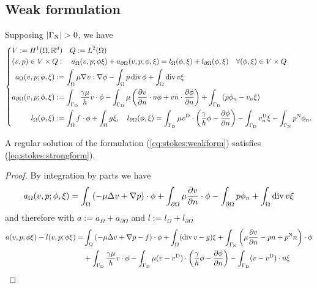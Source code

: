 \subsection{Weak formulation}\label{subsec:}
%
Supposing $\abs{\GammaN}>0$, we have
%
\begin{equation}\label{eq:stokes:weakform}
%
\left\{
\begin{aligned}
&V :=  H^1(\Omega,\R^d)\quad Q := L^2(\Omega)\\
&(v,p)\in V\times Q:\quad a_{\Omega}(v,p; \phi\xi) + a_{\partial\Omega}(v,p; \phi,\xi) = l_{\Omega}(\phi,\xi)+l_{\partial\Omega}(\phi,\xi) \quad\forall (\phi,\xi)\in V\times Q\\
&\begin{aligned}
a_{\Omega}(v,p; \phi,\xi) &:= \int_{\Omega} \mu \nabla v:\nabla\phi - \int_{\Omega}p \div \phi + \int_{\Omega} \div v \xi\\
 a_{\partial\Omega}(v,p; \phi,\xi) &:= \int_{\GammaD}\frac{\gamma\mu}{h}v\cdot\phi - 
 \int_{\GammaD}\mu \left(  \dn{v}\cdot n \phi + v n \cdot \dn{\phi}\right) 
 + \int_{\GammaD} \left( p \phi_n - v_n \xi\right)\\
 l_{\Omega}(\phi,\xi) &:= \int_{\Omega} f\cdot\phi + \int_{\Omega} g\xi, \quad
 l_{\partial\Omega}(\phi,\xi) = \int_{\GammaD}\mu\vD\cdot\left( \frac{\gamma}{h}\phi - \dn{\phi}\right)- \int_{\GammaD}\vD_n\xi
 - \int_{\GammaN} \pN \phi_n.
\end{aligned}
\end{aligned}
\right.
%
\end{equation}
%
\begin{lemma}\label{lemma:}
A regular solution of the formulation (\ref{eq:stokes:weakform}) satisfies (\ref{eq:stokes:strongform}).
\end{lemma}
%
\begin{proof}
By integration by parts we have
%
\begin{align*}
a_{\Omega}(v,p; \phi,\xi) = \int_{\Omega} \left( -\mu \Delta v+\nabla p\right)\cdot\phi + 
\int_{\partial\Omega} \mu\frac{\partial v}{\partial n}\cdot\phi - \int_{\partial\Omega} p\phi_n
+\int_{\Omega} \operatorname{div} v \xi
\end{align*}
%
and therefore with $a:=a_{\Omega}+a_{\partial\Omega}$ and $l:=l_{\Omega}+l_{\partial\Omega}$
%
\begin{align*}
a(v,p; \phi\xi) - l(v,p; \phi\xi) =& 
\int_{\Omega} \left( -\mu \Delta v+\nabla p -f \right)\cdot\phi + \int_{\Omega} (\operatorname{div} v -g)\xi
+ \int_{\Gamma_{\rm N}} \left(\mu\frac{\partial v}{\partial n}-p n + p^{\rm N} n\right)\cdot\phi\\
&+  \int_{\Gamma_{\rm D}}\frac{\gamma\mu}{h}v\cdot\phi - 
 \int_{\Gamma_{\rm D}}\mu(v-v^{\rm D})\cdot\left( \frac{\gamma}{h}\phi - \frac{\partial \phi}{\partial n}\right)
 - \int_{\Gamma_{\rm D}} (v-v^{\rm D})\cdot n\xi
\end{align*}
%


\end{proof}
%



